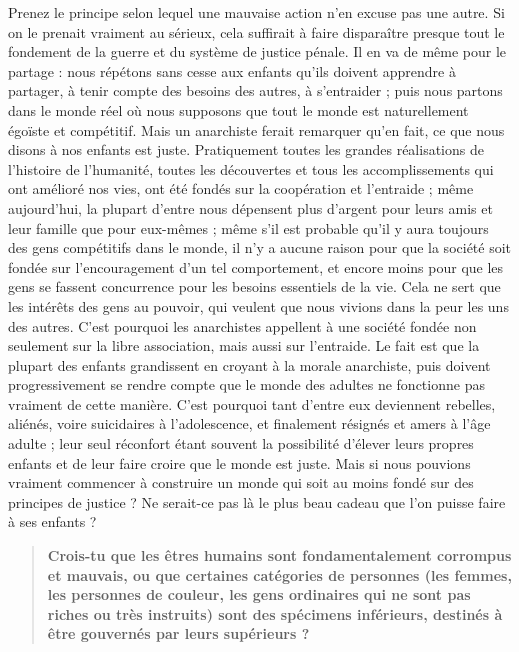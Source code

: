 Prenez le principe selon lequel une mauvaise action n'en excuse pas une autre. Si on le prenait vraiment au sérieux, cela suffirait à faire disparaître presque tout le fondement de la guerre et du système de justice pénale. Il en va de même pour le partage : nous répétons sans cesse aux enfants qu'ils doivent apprendre à partager, à tenir compte des besoins des autres, à s'entraider ; puis nous partons dans le monde réel où nous supposons que tout le monde est naturellement égoïste et compétitif. Mais un anarchiste ferait remarquer qu'en fait, ce que nous disons à nos enfants est juste. Pratiquement toutes les grandes réalisations de l'histoire de l'humanité, toutes les découvertes et tous les accomplissements qui ont amélioré nos vies, ont été fondés sur la coopération et l'entraide ; même aujourd'hui, la plupart d'entre nous dépensent plus d'argent pour leurs amis et leur famille que pour eux-mêmes ; même s'il est probable qu'il y aura toujours des gens compétitifs dans le monde, il n'y a aucune raison pour que la société soit fondée sur l'encouragement d'un tel comportement, et encore moins pour que les gens se fassent concurrence pour les besoins essentiels de la vie. Cela ne sert que les intérêts des gens au pouvoir, qui veulent que nous vivions dans la peur les uns des autres. C'est pourquoi les anarchistes appellent à une société fondée non seulement sur la libre association, mais aussi sur l'entraide. Le fait est que la plupart des enfants grandissent en croyant à la morale anarchiste, puis doivent progressivement se rendre compte que le monde des adultes ne fonctionne pas vraiment de cette manière. C'est pourquoi tant d'entre eux deviennent rebelles, aliénés, voire suicidaires à l'adolescence, et finalement résignés et amers à l'âge adulte ; leur seul réconfort étant souvent la possibilité d'élever leurs propres enfants et de leur faire croire que le monde est juste. Mais si nous pouvions vraiment commencer à construire un monde qui soit au moins fondé sur des principes de justice ? Ne serait-ce pas là le plus beau cadeau que l'on puisse faire à ses enfants ?

\begin{quotation}
\textbf{Crois-tu que les êtres humains sont fondamentalement corrompus et mauvais, ou que certaines catégories de personnes (les femmes, les personnes de couleur, les gens ordinaires qui ne sont pas riches ou très instruits) sont des spécimens inférieurs, destinés à être gouvernés par leurs supérieurs ?}
\end{quotation}

